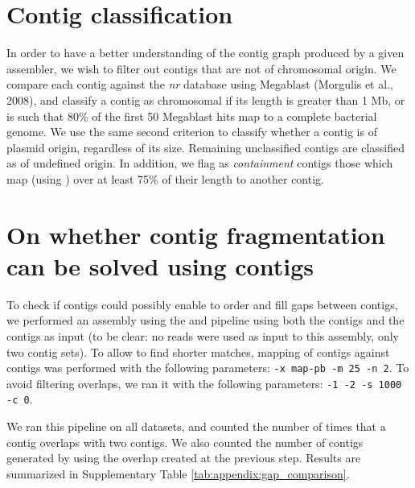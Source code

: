 \documentclass[./main.tex]{subfiles}
\begin{document}
\section{Contig classification ~\label{sec:appendix_contig_classification}}

In order to have a better understanding of the contig graph produced by a given assembler, we wish to filter out contigs that are not of chromosomal origin. %
We compare each contig against the \emph{nr} database using Megablast (Morgulis et al., 2008), and classify a contig as chromosomal if its length is greater than 1 Mb, or is such that 80\% of the first 50 Megablast hits map to a complete bacterial genome. %
We use the same second criterion to classify whether a contig is of plasmid origin, regardless of its size. %
Remaining unclassified contigs are classified as of undefined origin. %
In addition, we flag as \emph{containment} contigs those which map (using \minimap) over at least 75\% of their length to another contig.%




\section{On whether \canu contig fragmentation can be solved using \miniasm contigs \label{sec:appendix:gap_comparison}}


To check if \miniasm contigs could possibly enable to order and fill gaps between \canu contigs, we performed an assembly using the \minimap and \miniasm pipeline using both the \canu contigs and the \miniasm contigs as input (to be clear: no reads were used as input to this assembly, only two contig sets). To allow \minimap to find shorter matches, mapping of \miniasm contigs against \canu contigs was performed with the following parameters: \texttt{-x map-pb -m 25 -n 2}. To avoid \miniasm filtering overlaps,  we ran it with the following parameters: \texttt{-1 -2 -s 1000 -c 0}.

We ran this pipeline on all datasets, and counted the number of times that a \miniasm contig overlaps with two \canu contigs. We also counted the number of contigs generated by \miniasm using the overlap created at the previous step. Results are summarized in Supplementary Table \ref{tab:appendix:gap_comparison}.
\end{document}
